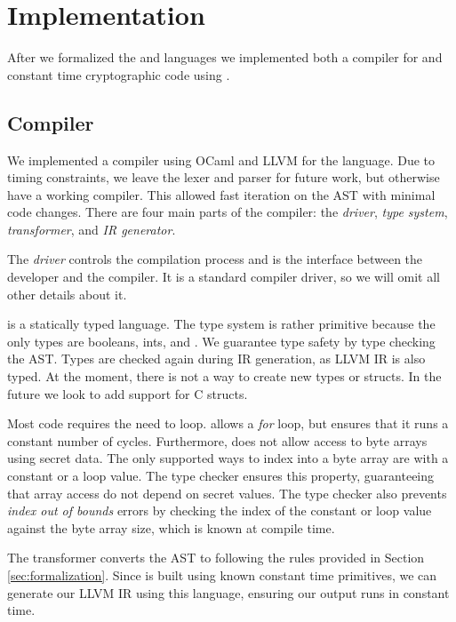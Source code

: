 \section{Implementation}
\label{sec:implementation}

After we formalized the \constc and \ccore languages we implemented both a compiler for \constc and constant time cryptographic code using \constc.

\subsection{\constc Compiler}
We implemented a compiler using OCaml and LLVM for the \constc language. Due to timing constraints, we leave the lexer and parser for future work, but otherwise have a working compiler. This allowed fast iteration on the AST with minimal code changes. There are four main parts of the \constc compiler: the \textit{driver}, \textit{type system}, \textit{transformer}, and \textit{IR generator}.

 The \textit{driver} controls the compilation process and is the interface between the developer and the compiler. It is a standard compiler driver, so we will omit all other details about it.

 \constc is a statically typed language. The type system is rather primitive because the only types are booleans, ints, and \bytearrays. We guarantee type safety by type checking the \constc AST. Types are checked again during IR generation, as LLVM IR is also typed. At the moment, there is not a way to create new types or structs. In the future we look to add support for C structs.

Most code requires the need to loop. \constc allows a \textit{for} loop, but ensures that it runs a constant number of cycles. Furthermore, \constc does not allow access to byte arrays using secret data. The only supported ways to index into a byte array are with a constant or a loop value. The type checker ensures this property, guaranteeing that array access do not depend on secret values. The type checker also prevents \textit{index out of bounds} errors by checking the index of the constant or loop value against the byte array size, which is known at compile time.

 The transformer converts the \constc AST to \ccore following the rules provided in Section \ref{sec:formalization}. Since \ccore is built using known constant time primitives, we can generate our LLVM IR using this language, ensuring our output runs in constant time.

